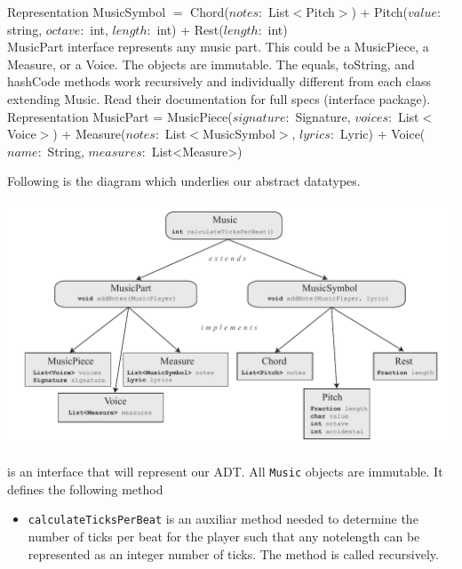 \documentclass[12pt]{book}
\begin{document}
Representation MusicSymbol $=$ Chord($notes:$ List$<$Pitch$>$) + Pitch($value:$ string, $octave:$ int, $length:$ int) + Rest($length:$ int) \\

MusicPart interface represents any music part. This could be a MusicPiece, a Measure, or a Voice. The objects are immutable. The equals, toString, and hashCode methods work recursively and individually different from each class extending Music. Read their documentation for full specs (interface package). \\ 

Representation MusicPart = MusicPiece($signature:$ Signature, $voices:$ List$<$Voice$>$) + Measure($notes:$ List$<$MusicSymbol$>$, $lyrics:$ Lyric) + Voice($name:$ String, $measures:$ List<Measure>) \\

\newpage

\bigskip

Following is the diagram which underlies our abstract datatypes. 

\centerline{ \includegraphics{Music.pdf}}

 is an interface that will represent our ADT. All {\tt Music} objects are immutable. It defines the following method

\begin{itemize} 

\item { \tt calculateTicksPerBeat} is an auxiliar method needed to determine the number of ticks per beat for the player such that any notelength can be represented as an integer number of ticks. The method is called recursively.
\end{itemize}

\medskip 
\end{document}
